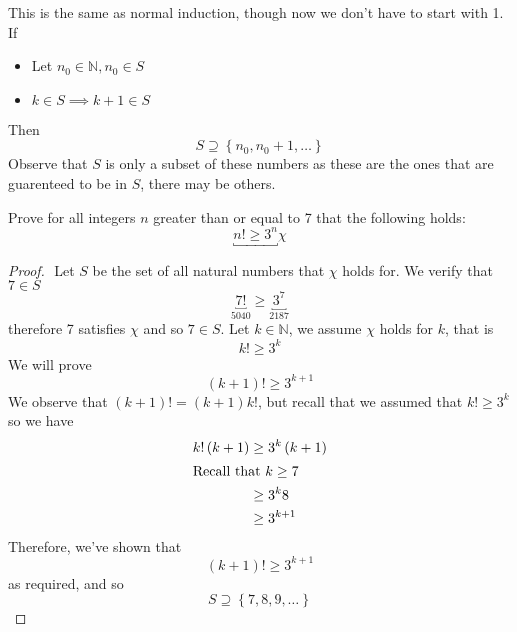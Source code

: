 \documentclass[11pt]{book}
\begin{document}
\newpage

\begin{defn}\label{defn:extended_principle_of_mathmatical_induction_}
    This is the same as normal induction, though now we don't have to start with 1.
    If  
    \begin{itemize}
        \item Let $n_{0} \in \mathbb{N} , n_{0} \in S$
        \item $k \in S \implies k + 1 \in S$ 
    \end{itemize}
    Then
    \[
    \boxed{S \supseteq \left\{ n_{0} , n_{0}  + 1, \ldots  \right\}  }
    \]
    Observe that $S$ is only a subset of these numbers as these are the ones that are guarenteed to be in $S$, there may be others. 
\end{defn}

\begin{eg}
    Prove for all integers $n$ greater than or equal to 7 that the following holds:
    \[
        \underbracket{ n! \ge 3^{n} }{\chi}
    \]
    \begin{proof}
    $ $\newline
        Let $S$ be the set of all natural numbers that $\chi $ holds for. We verify that $7 \in S$ 
        \[
        \underbracket{7!}_{5040} \ge \underbracket{3^{7} }_{2187} 
        \]
        therefore 7 satisfies $\chi$ and so $7 \in S$.
        Let $k \in \mathbb{N} $,  we assume $\chi$ holds for $k$, that is 
        \[
        k! \ge 3^{k} 
        \]
        We will prove 
        \[
            \left( k + 1 \right) ! \ge 3^{k + 1} 
        \]
        We observe that $\left( k + 1 \right) ! = \left( k + 1 \right) k!$, but recall that we assumed that $k! \ge 3^{k} $ so we have 
        \begin{align*}
            k!\left( k + 1 \right) &\ge 3^{k} \left( k + 1 \right) \\
            \intertext{Recall that $k\ge 7$ }
            &\ge 3^{k} 8   \\ 
            &\ge 3^{k + 1}
        \end{align*}
        Therefore, we've shown that
        \[
            \left( k + 1 \right) ! \ge 3^{k + 1} 
        \]
        as required, and so 
        \[
        S \supseteq \left\{ 7, 8, 9, \ldots  \right\} 
        \]
    \end{proof}
    
\end{eg}


\end{document}
